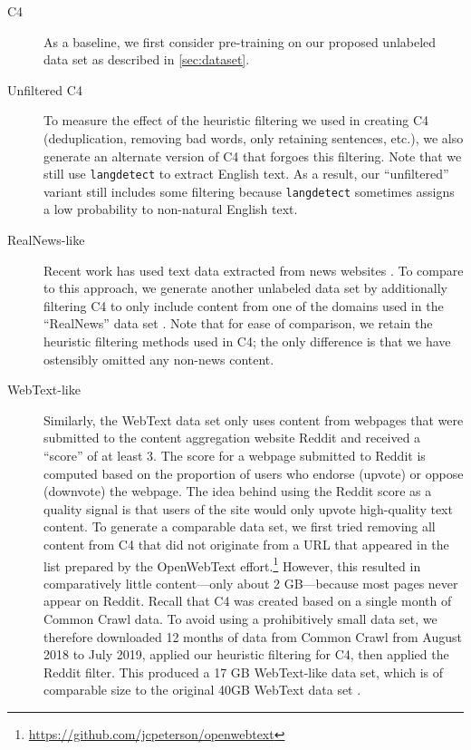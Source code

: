 \begin{description}
\item[C4] As a baseline, we first consider pre-training on our proposed unlabeled data set as described in \ref{sec:dataset}.

\item[Unfiltered C4] To measure the effect of the heuristic filtering we used in creating C4 (deduplication, removing bad words, only retaining sentences, etc.), we also generate an alternate version of C4 that forgoes this filtering. Note that we still use \texttt{langdetect} to extract English text. As a result, our ``unfiltered'' variant still includes some filtering because \texttt{langdetect} sometimes assigns a low probability to non-natural English text.

\item[RealNews-like] Recent work has used text data extracted from news websites \citep{zellers2019defending,baevski2019cloze}. To compare to this approach, we generate another unlabeled data set by additionally filtering C4 to only include content from one of the domains used in the ``RealNews'' data set \citep{zellers2019defending}. Note that for ease of comparison, we retain the heuristic filtering methods used in C4; the only difference is that we have ostensibly omitted any non-news content.

\item[WebText-like] Similarly, the WebText data set \citep{radford2019language} only uses content from webpages that were submitted to the content aggregation website Reddit and received a ``score'' of at least 3. The score for a webpage submitted to Reddit is computed based on the proportion of users who endorse (upvote) or oppose (downvote) the webpage. The idea behind using the Reddit score as a quality signal is that users of the site would only upvote high-quality text content. To generate a comparable data set, we first tried removing all content from C4 that did not originate from a URL that appeared in the list prepared by the OpenWebText effort.\footnote{\url{https://github.com/jcpeterson/openwebtext}}
However, this resulted in comparatively little content---only about 2 GB---because most pages never appear on Reddit. Recall that C4 was created based on a single month of Common Crawl data. To avoid using a prohibitively small data set, we therefore downloaded 12 months of data from Common Crawl from August 2018 to July 2019, applied our heuristic filtering for C4, then applied the Reddit filter. This produced a 17 GB WebText-like data set, which is of comparable size to the original 40GB WebText data set \citep{radford2019language}.


\end{description}
